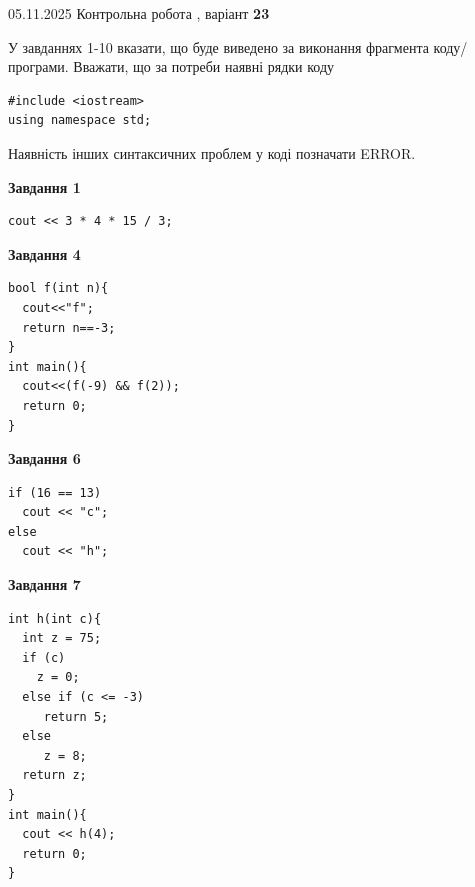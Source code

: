 \documentclass[12pt, ukrainian]{article}
\begin{document}
{\Large{05.11.2025 Контрольна робота , варіант  \No \textbf { 23 }\par}}
{
\begin {large}
У завданнях 1-10 вказати, що буде виведено за виконання фрагмента коду/про\-гра\-ми.
Вважати, що за потреби наявні рядки коду
\begin{verbatim}
#include <iostream>
using namespace std;
\end{verbatim}
Наявність інших синтаксичних проблем у коді позначати ERROR.

\begin{minipage}[t]{7.0cm}

\begin{center}
\textbf{Завдання 1}
\end{center}
\vspace{-8mm}

\begin{verbatim}
cout << 3 * 4 * 15 / 3;
\end{verbatim}



\begin{center}
\textbf{Завдання 4}
\end{center}
\vspace{-8mm}

\begin{verbatim}
bool f(int n){
  cout<<"f";
  return n==-3;
}
int main(){
  cout<<(f(-9) && f(2));
  return 0;
}
\end{verbatim}



\begin{center}
\textbf{Завдання 6}
\end{center}
\vspace{-8mm}

\begin{verbatim}
if (16 == 13)
  cout << "c";
else
  cout << "h";
\end{verbatim}



\begin{center}
\textbf{Завдання 7}
\end{center}
\vspace{-8mm}

\begin{verbatim}
int h(int c){
  int z = 75;
  if (c)
    z = 0;
  else if (c <= -3)
     return 5;
  else
     z = 8;
  return z;
}
int main(){
  cout << h(4);
  return 0;
}
\end{verbatim}


\end{minipage}
\end{large}}
\end{document}
